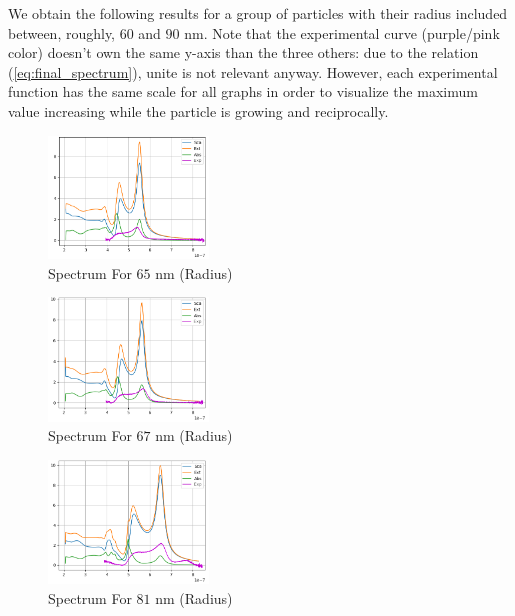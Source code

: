 \documentclass{article}
\numberwithin{equation}{section}
\begin{document}
We obtain the following results for a group of particles with their radius included between, roughly, $60$ and $90$ nm. Note that the experimental curve (purple/pink color) doesn't own the same y-axis than the three others: due to the relation (\ref{eq:final_spectrum}), unite is not relevant anyway. However, each experimental function has the same scale for all graphs in order to visualize the maximum value increasing while the particle is growing and reciprocally.

\begin{figure}[h!]
    \centering
    \includegraphics[width=0.38\textwidth, height=0.28\textwidth]{result_65nm.png}
    \caption{Spectrum For $65$ nm (Radius)}
    \label{fig:result_65nm}
\end{figure}

\begin{figure}[h!]
    \centering
    \includegraphics[width=0.38\textwidth, height=0.28\textwidth]{result_67nm.png}
    \caption{Spectrum For $67$ nm (Radius)}
    \label{fig:result_67nm}
\end{figure}

\begin{figure}[h!]
    \centering
    \includegraphics[width=0.38\textwidth, height=0.28\textwidth]{result_81nm.png}
    \caption{Spectrum For $81$ nm (Radius)}
    \label{fig:result_81nm}
\end{figure}
\end{document}

